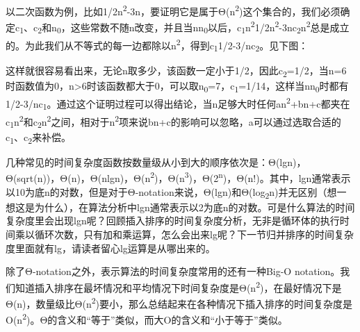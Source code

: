 以二次函数为例，比如1/\BookSplit{}2n\textsuperscript{2}-3n，要证明它是属于Θ(n\textsuperscript{2})这个集合的，我们必须确定c\textsubscript{1}、c\textsubscript{2}和n\textsubscript{0}，这些常数不随n改变，并且当nn\textsubscript{0}以后，c\textsubscript{1}n\textsuperscript{2}1/\BookSplit{}2n\textsuperscript{2}-3nc\textsubscript{2}n\textsuperscript{2}总是成立的。为此我们从不等式的每一边都除以n\textsuperscript{2}，得到c\textsubscript{1}1/\BookSplit{}2-3/\BookSplit{}nc\textsubscript{2}。见下图：




这样就很容易看出来，无论n取多少，该函数一定小于1/\BookSplit{}2，因此c\textsubscript{2}=1/\BookSplit{}2，当n=\BookSplit{}6时函数值为0，n\textgreater{}6时该函数都大于0，可以取n\textsubscript{0}=7，c\textsubscript{1}=1/\BookSplit{}14，这样当nn\textsubscript{0}时都有1/\BookSplit{}2-3/\BookSplit{}nc\textsubscript{1}。通过这个证明过程可以得出结论，当n足够大时任何an\textsuperscript{2}+bn+\BookSplit{}c都夹在c\textsubscript{1}n\textsuperscript{2}和c\textsubscript{2}n\textsuperscript{2}之间，相对于n\textsuperscript{2}项来说bn+\BookSplit{}c的影响可以忽略，a可以通过选取合适的c\textsubscript{1}、c\textsubscript{2}来补偿。



几种常见的时间复杂度函数按数量级从小到大的顺序依次是：Θ(lgn)，Θ(sqrt(n))，Θ(n)，Θ(nlgn)，Θ(n\textsuperscript{2})，Θ(n\textsuperscript{3})，Θ(2\textsuperscript{n})，Θ(n!)。其中，lgn通常表示以10为底n的对数，但是对于Θ-notation来说，Θ(lgn)和Θ(log\textsubscript{2}n)并无区别（想一想这是为什么），在算法分析中lgn通常表示以2为底n的对数。可是什么算法的时间复杂度里会出现lgn呢？回顾插入排序的时间复杂度分析，无非是循环体的执行时间乘以循环次数，只有加和乘运算，怎么会出来lg呢？下一节归并排序的时间复杂度里面就有lg，请读者留心lg运算是从哪出来的。



除了Θ-notation之外，表示算法的时间复杂度常用的还有一种Big-O notation。我们知道插入排序在最坏情况和平均情况下时间复杂度是Θ(n\textsuperscript{2})，在最好情况下是Θ(n)，数量级比Θ(n\textsuperscript{2})要小，那么总结起来在各种情况下插入排序的时间复杂度是O(n\textsuperscript{2})。Θ的含义和“等于”类似，而大O的含义和“小于等于”类似。



